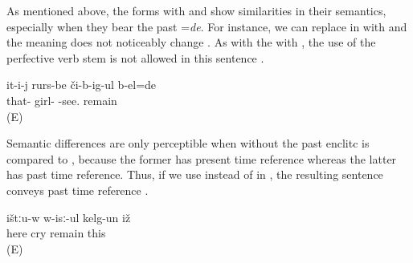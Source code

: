 As mentioned above, the forms with  and  show similarities in their semantics, especially when they bear the past  =\textit{de}. For instance, we can replace  in  with  and the meaning does not noticeably change . As with the  with , the use of the perfective verb stem is not allowed in this sentence .
%
\begin{exe}
	\ex	\label{‎‎He was seeing the girls.BEL}
	\gll it-i-j	rurs-be	či-b-ig-ul	b-el=de\\
	that-	girl-	-see.	remain\\
	\glt {} (E)
	

\end{exe}

Semantic differences are only perceptible when  without the past enclitc is compared to , because the former has present time reference whereas the latter has past time reference. Thus, if we use  instead of  in , the resulting sentence conveys past time reference .
%
\begin{exe}
	\ex	\label{ex:Here he remained crying kelg-un}
	\gll	ištːu-w	w-isː-ul	kelg-un	iž\\
		here	cry	remain	this\\
	\glt	{} (E)

\end{exe}



